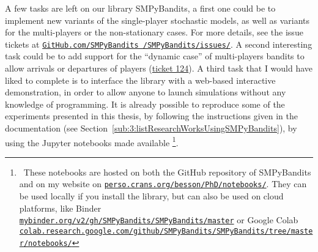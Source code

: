 A few tasks are left on our library SMPyBandits, a first one could be to implement new variants of the single-player stochastic models, as well as variants for the multi-players or the non-stationary cases.
For more details, see the issue tickets at \href{https://github.com/SMPyBandits/SMPyBandits/issues/}{\texttt{GitHub.com/SMPyBandits /SMPyBandits/issues/}}.
%
A second interesting task could be
to add support for the ``dynamic case'' of multi-players bandits to allow arrivals or departures of players (\href{https://github.com/SMPyBandits/SMPyBandits/issues/124}{ticket 124}).
%
A third task that I would have liked to complete is to interface the library with a web-based interactive demonstration, in order to allow anyone to launch simulations without any knowledge of programming.
It is already possible to reproduce some of the experiments presented in this thesis,
by following the instructions given in the documentation (see Section~\ref{sub:3:listResearchWorksUsingSMPyBandits}),
by using the Jupyter notebooks \cite{jupyter} made available%
\footnote{~These notebooks are hosted on both the GitHub repository of SMPyBandits and on my website on \href{https://perso.crans.org/besson/PhD/notebooks/}{\texttt{perso.crans.org/besson/PhD/notebooks/}}. They can be used locally if you install the library, but can also be used on cloud platforms, like Binder \href{https://mybinder.org/v2/gh/SMPyBandits/SMPyBandits/master}{\texttt{mybinder.org/v2/gh/SMPyBandits/SMPyBandits/master}} or Google Colab \href{https://colab.research.google.com/github/SMPyBandits/SMPyBandits/tree/master/notebooks/}{\texttt{colab.research.google.com/github/SMPyBandits/SMPyBandits/tree/master/notebooks/}}}.







